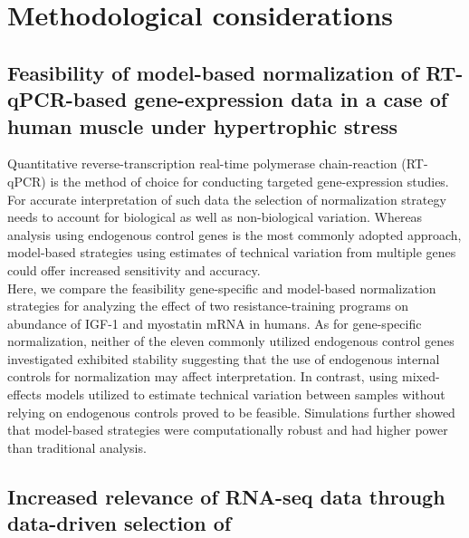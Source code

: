 \documentclass[twoside,10pt]{gihclass} %
\begin{document}
\hypertarget{methodological-considerations}{%
\chapter{Methodological considerations}\label{methodological-considerations}}

\hypertarget{feasibility-of-model-based-normalization-of-rt-qpcr-based-gene-expression-data-in-a-case-of-human-muscle-under-hypertrophic-stress}{%
\section{Feasibility of model-based normalization of RT-qPCR-based gene-expression data in a case of human muscle under hypertrophic stress}\label{feasibility-of-model-based-normalization-of-rt-qpcr-based-gene-expression-data-in-a-case-of-human-muscle-under-hypertrophic-stress}}

Quantitative reverse-transcription real-time polymerase chain-reaction (RT-qPCR) is the method of choice for conducting targeted gene-expression studies.
For accurate interpretation of such data the selection of normalization strategy needs to account for biological as well as non-biological variation.
Whereas analysis using endogenous control genes is the most commonly adopted approach, model-based strategies using estimates of technical variation from multiple genes could offer increased sensitivity and accuracy.\\
Here, we compare the feasibility gene-specific and model-based normalization strategies for analyzing the effect of two resistance-training programs on abundance of IGF-1 and myostatin mRNA in humans. As for gene-specific normalization, neither of the eleven commonly utilized endogenous control genes investigated exhibited stability suggesting that the use of endogenous internal controls for normalization may affect interpretation. In contrast, using mixed-effects models utilized to estimate technical variation between samples without relying on endogenous controls proved to be feasible.
Simulations further showed that model-based strategies were computationally robust and had higher power than traditional analysis.

\hypertarget{increased-relevance-of-rna-seq-data-through-data-driven-selection-of}{%
\section{Increased relevance of RNA-seq data through data-driven selection of}\label{increased-relevance-of-rna-seq-data-through-data-driven-selection-of}}
\end{document}
